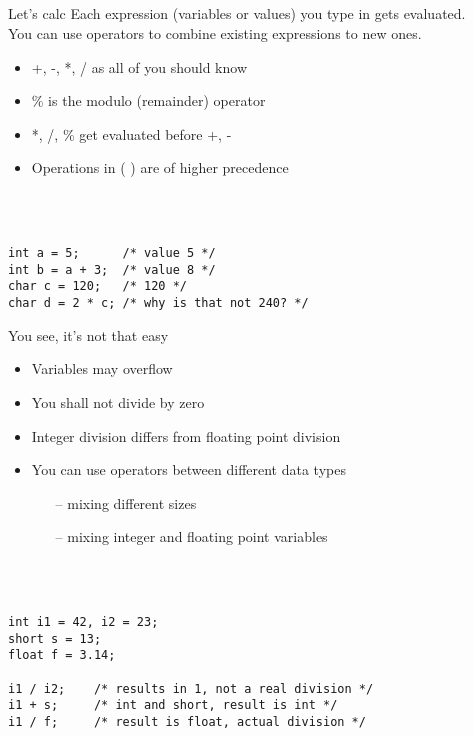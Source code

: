 \subsection{}
\begin{frame}[fragile]{Let's calc}
	Each expression (variables or values) you type in gets evaluated.\\
	You can use operators to combine existing expressions to new ones.
\ \\
	\begin{itemize}
		\item +, -, *, / as all of you should know
		\item \% is the modulo (remainder) operator
		\item *, /, \% get evaluated before +, -
		\item Operations in (  ) are of higher precedence
	\end{itemize}\ \\\ \\
	\begin{lstlisting}
int a = 5; 		/* value 5 */
int b = a + 3;	/* value 8 */
char c = 120;	/* 120 */
char d = 2 * c;	/* why is that not 240? */
\end{lstlisting}
\end{frame}
\begin{frame}[fragile]{You see, it's not that easy}
	\begin{itemize}
		\item Variables may overflow
		\item You shall not divide by zero
		\item Integer division differs from floating point division
		\item You can use operators between different data types
		\begin{itemize}
			\item[--] mixing different sizes
			\item[--] mixing integer and floating point variables
		\end{itemize}
	\end{itemize}
	\ \\\ \\
	\begin{lstlisting}[numbers=none]
int i1 = 42, i2 = 23;
short s = 13;
float f = 3.14;

i1 / i2;	/* results in 1, not a real division */
i1 + s;		/* int and short, result is int */
i1 / f;		/* result is float, actual division */
\end{lstlisting}
\end{frame}
